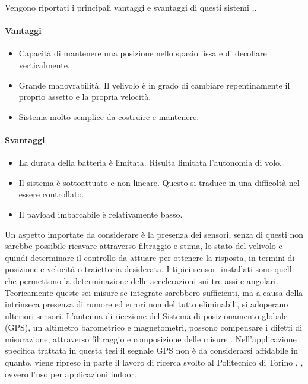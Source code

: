 Vengono riportati i principali vantaggi e svantaggi di questi sistemi \cite{DesTestCarm},\cite{irisquad}.
\paragraph{Vantaggi}
\begin{itemize}
	\item Capacità di mantenere una posizione nello spazio fissa e di decollare verticalmente.
	\item Grande manovrabilità. Il velivolo è in grado di cambiare repentinamente il proprio assetto e la propria velocità.
	\item Sistema molto semplice da costruire e mantenere.
\end{itemize}
\paragraph{Svantaggi}
\begin{itemize}
	\item La durata della batteria è limitata. Risulta limitata l'autonomia di volo.
	\item Il sistema è sottoattuato e non lineare. Questo si traduce in una difficoltà nel essere controllato.
	\item Il payload imbarcabile è relativamente basso.
\end{itemize}

Un aspetto importate da considerare è la presenza dei sensori, senza di questi non sarebbe possibile ricavare attraverso filtraggio e stima, lo stato del velivolo e quindi determinare il controllo da attuare per ottenere la risposta, in termini di posizione e velocità o traiettoria desiderata. I tipici sensori installati sono quelli che permettono la determinazione delle accelerazioni sui tre assi e angolari. Teoricamente queste sei misure se integrate sarebbero sufficienti, ma a causa della intrinseca presenza di rumore ed errori non del tutto eliminabili, si adoperano ulteriori sensori. L'antenna di ricezione del Sistema di posizionamento globale (GPS), un altimetro barometrico e magnetometri, possono compensare i difetti di misurazione, attraverso filtraggio e composizione delle misure \cite{KoksalN2018ALQA}. Nell'applicazione specifica trattata in questa tesi il segnale GPS non è da considerarsi affidabile in quanto, viene ripreso in parte il lavoro di ricerca svolto al Politecnico di Torino \cite{DesTestCarm}, \cite{baseTesi}, ovvero l'uso per applicazioni indoor.



